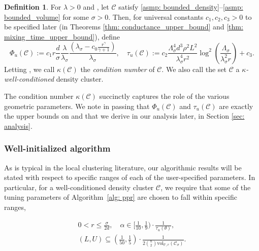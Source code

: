 \documentclass[11pt,twoside]{article}
\theoremstyle{definition}
\newtheorem{definition}{Definition}
\newcommand{\vol}{\mathrm{vol}}
\newcommand{\1}{\mathbbm{1}}
\newcommand{\Phibf}{\Phi_{u}}
\newcommand{\taubf}{\tau_{u}}
\newcommand{\Xbf}{X}
\newcommand{\Pbb}{\mathbb{P}}
\newcommand{\Cbb}{\mathbb{C}}
\newcommand{\Cset}{\mathcal{C}}
\newcommand{\Csig}{\Cset_{\sigma}}
\begin{document}
\begin{definition}
  \label{def:well_conditioned_density_cluster}
  For $\lambda > 0$ and \smash{$\Cset \in \Cbb_f(\lambda)$}, let $\Cset$ satisfy  
  \ref{asmp: bounded_density}--\ref{asmp: bounded_volume} for some $\sigma >
  0$. Then, for universal constants $c_1, c_2, c_3 > 0$ to be specified later
  (in Theorems \ref{thm: conductance_upper_bound} and \ref{thm:
    mixing_time_upper_bound}), define
  \begin{equation}
    \label{eqn: condition_number}
    \Phibf(\Cset) 
    := c_1 r \frac{d}{\sigma} \frac{\lambda}{\lambda_{\sigma}}
    \frac{(\lambda_{\sigma} - c_0 \frac{r^{\gamma}}{\gamma +
        1})}{\lambda_{\sigma}}, \quad
    \taubf(\Cset) := c_2 \frac{\Lambda_{\sigma}^4 d^3 \rho^2
      L^2}{\lambda_{\sigma}^4 r^2}
    \log^2\left(\frac{\Lambda_{\sigma}}{\lambda_{\sigma}^2r}\right) + c_3.
  \end{equation}
  Letting \smash{$\kappa(\Cset) := \Phibf(\Cset) \cdot \taubf(\Cset)$},
  we call $\kappa(\Cset)$ the \emph{condition number} of $\Cset$.  We also call
  the set $\Cset$ a \emph{$\kappa$-well-conditioned} density cluster.  
\end{definition}

The condition number $\kappa(\Cset)$ succinctly captures the role of the various 
geometric parameters.  We note in passing that $\Phibf(\Cset)$ and
$\taubf(\Cset)$ are exactly the upper bounds  on \smash{$\Phi(\Csig[\Xbf];
  G_{n,r})$} and \smash{$\tau_{\infty}(G_{n,r}[\Csig[\Xbf]])$} that we derive in
our analysis later, in Section \ref{sec: analysis}. 

\subsubsection{Well-initialized algorithm} 

As is typical in the local clustering literature, our algorithmic results will
be stated with respect to specific ranges of each of the user-specified
parameters. In particular, for a well-conditioned density cluster $\Cset$, we
require that some of the tuning parameters of Algorithm~\ref{alg: ppr} are
chosen to fall within specific ranges,

\begin{equation}
\begin{gathered}
\label{eqn: initialization}
0 < r \leq \frac{\sigma}{2d}, \quad 
\alpha \in {\textstyle [\frac{1}{10}, \frac{1}{9})} \cdot
\frac{1}{\taubf(\theta)}, \\ 
(L,U) \subseteq {\textstyle(\frac{1}{50},\frac{1}{5})} \cdot 
\frac{1}{2{n \choose 2} \vol_{\Pbb,r}(\Csig)}.  
\end{gathered}
\end{equation}
\end{document}
